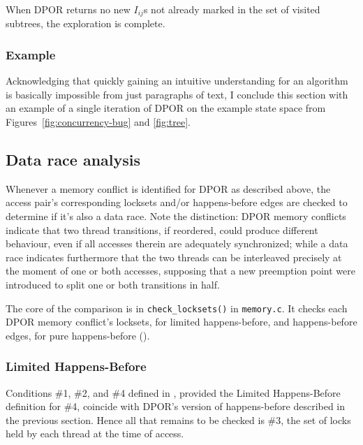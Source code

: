 When DPOR returns no new $I_{ij}$s not already marked in the set of visited subtrees,
the exploration is complete.

\subsubsection{Example}

Acknowledging that quickly gaining an intuitive understanding for an algorithm
is basically impossible from just paragraphs of text,
I conclude this section with an example of a single iteration of DPOR
on the example state space from Figures~\ref{fig:concurrency-bug} and \ref{fig:tree}.



\subsection{Data race analysis}
\label{sec:landslide-datarace}

Whenever a memory conflict is identified for DPOR as described above,
the access pair's corresponding locksets and/or happens-before edges are checked to determine if it's also a data race.
Note the distinction: DPOR memory conflicts indicate that two thread transitions,
if reordered, could produce different behaviour, even if all accesses therein are adequately synchronized;
while a data race indicates furthermore that the two threads can be interleaved precisely at the moment of one or both accesses,
supposing that a new preemption point were introduced to split one or both transitions in half.

The core of the comparison is in {\tt check\_locksets()} in {\tt memory.c}.
It checks each DPOR memory conflict's locksets, for limited happens-before,
and happens-before edges, for pure happens-before
(\sect{\ref{sec:background-hb}}).

\subsubsection{Limited Happens-Before}
\label{sec:landslide-lhb}

Conditions \#1, \#2, and \#4 defined in \sect{\ref{sec:background-hb}},
provided the Limited Happens-Before definition for \#4,
coincide with DPOR's version of happens-before described in the previous section.
Hence all that remains to be checked is \#3, the set of locks held by each thread at the time of access.


